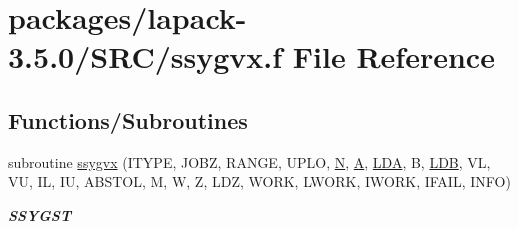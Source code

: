 \hypertarget{ssygvx_8f}{}\section{packages/lapack-\/3.5.0/\+S\+R\+C/ssygvx.f File Reference}
\label{ssygvx_8f}
\subsection*{Functions/\+Subroutines}
\begin{DoxyCompactItemize}
\item 
subroutine \hyperlink{group__realSYeigen_ga29a3927f20cd9692c94ff14babe54ffa}{ssygvx} (I\+T\+Y\+P\+E, J\+O\+B\+Z, R\+A\+N\+G\+E, U\+P\+L\+O, \hyperlink{polmisc_8c_a0240ac851181b84ac374872dc5434ee4}{N}, \hyperlink{classA}{A}, \hyperlink{example__user_8c_ae946da542ce0db94dced19b2ecefd1aa}{L\+D\+A}, B, \hyperlink{example__user_8c_a50e90a7104df172b5a89a06c47fcca04}{L\+D\+B}, V\+L, V\+U, I\+L, I\+U, A\+B\+S\+T\+O\+L, M, W, Z, L\+D\+Z, W\+O\+R\+K, L\+W\+O\+R\+K, I\+W\+O\+R\+K, I\+F\+A\+I\+L, I\+N\+F\+O)
\begin{DoxyCompactList}\small\item\em {\bfseries S\+S\+Y\+G\+S\+T} \end{DoxyCompactList}\end{DoxyCompactItemize}
